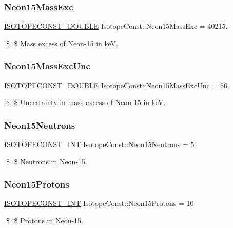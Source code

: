 \subsubsection{\texorpdfstring{Neon15\+Mass\+Exc}{Neon15MassExc}}
{\footnotesize\ttfamily \mbox{\hyperlink{group___isotope_const-_macros_ga8f45a7272ce02c0b4c65c44636ed719a}{I\+S\+O\+T\+O\+P\+E\+C\+O\+N\+S\+T\+\_\+\+D\+O\+U\+B\+LE}} Isotope\+Const\+::\+Neon15\+Mass\+Exc = 40215.}

\$ \$ Mass excess of Neon-\/15 in keV. \mbox{\label{group___isotope_const-_neon-_ne15_ga22634b34fa2aaf4124a1fbe2a309a0ed}} 
\subsubsection{\texorpdfstring{Neon15\+Mass\+Exc\+Unc}{Neon15MassExcUnc}}
{\footnotesize\ttfamily \mbox{\hyperlink{group___isotope_const-_macros_ga8f45a7272ce02c0b4c65c44636ed719a}{I\+S\+O\+T\+O\+P\+E\+C\+O\+N\+S\+T\+\_\+\+D\+O\+U\+B\+LE}} Isotope\+Const\+::\+Neon15\+Mass\+Exc\+Unc = 66.}

\$ \$ Uncertainty in mass excess of Neon-\/15 in keV. \mbox{\label{group___isotope_const-_neon-_ne15_gae56389b02cd267944c23afd7e66707e1}} 
\subsubsection{\texorpdfstring{Neon15\+Neutrons}{Neon15Neutrons}}
{\footnotesize\ttfamily \mbox{\hyperlink{group___isotope_const-_macros_ga5f18360b3e99483a35c32d789e62621c}{I\+S\+O\+T\+O\+P\+E\+C\+O\+N\+S\+T\+\_\+\+I\+NT}} Isotope\+Const\+::\+Neon15\+Neutrons = 5}

\$ \$ Neutrons in Neon-\/15. \mbox{\label{group___isotope_const-_neon-_ne15_ga73a8a93adcfdea8d2937cf360e93dacd}} 
\subsubsection{\texorpdfstring{Neon15\+Protons}{Neon15Protons}}
{\footnotesize\ttfamily \mbox{\hyperlink{group___isotope_const-_macros_ga5f18360b3e99483a35c32d789e62621c}{I\+S\+O\+T\+O\+P\+E\+C\+O\+N\+S\+T\+\_\+\+I\+NT}} Isotope\+Const\+::\+Neon15\+Protons = 10}

\$ \$ Protons in Neon-\/15. 